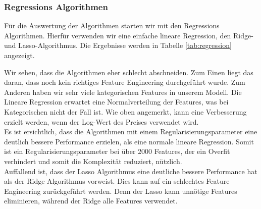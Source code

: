 \subsubsection{Regressions Algorithmen}
Für die Auswertung der Algorithmen starten wir mit den Regressions Algorithmen. Hierfür verwenden wir eine  einfache lineare Regression, den Ridge- und Lasso-Algorithmus. Die Ergebnisse werden in Tabelle \ref{tab:regression} angezeigt.\\[2ex]
%
\begin{table}[ht]
\centering
{}
\caption{Ergebnisse der Regression Algorithmen}
\label{tab:regression}
\end{table}
%
Wir sehen, dass die Algorithmen eher schlecht abschneiden. Zum Einen liegt das daran, dass noch kein richtiges Feature Engineering durchgeführt wurde. Zum Anderen haben wir sehr viele kategorischen Features in unserem Modell. Die Lineare Regression erwartet eine Normalverteilung der Features, was bei Kategorischen nicht der Fall ist. Wie oben angemerkt, kann eine Verbesserung erzielt werden, wenn der Log-Wert des Preises verwendet wird.\\
Es ist ersichtlich, dass die Algorithmen mit einem Regularisierungsparameter eine deutlich bessere Performance erzielen, als eine normale lineare Regression. Somit ist ein Regularisierungsparameter bei über 2000 Features, der ein Overfit verhindert und somit die Komplexität reduziert, nützlich.\\
Auffallend ist, dass der Lasso Algorithmus eine deutliche bessere Performance hat als der Ridge Algorithmus vorweist. Dies kann auf ein schlechtes Feature Engineering zurückgeführt werden. Denn der Lasso kann unnötige Features eliminieren, während der Ridge alle Features verwendet.
%
